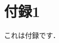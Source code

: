 \documentclass[main]{subfiles}
\begin{document}
\section{付録1}
これは付録です．\cite{Haxby2425}

\ifSubfilesClassLoaded{
  \newpage
  \printbibliography
}{}
\end{document}
